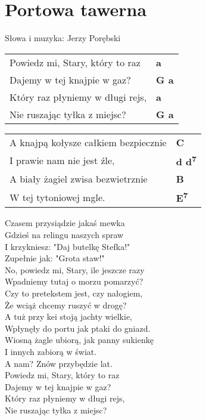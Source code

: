 \section{Portowa tawerna}

Słowa i muzyka: Jerzy Porębski

\vspace{2em}
\begin{tabular}{@{}p{6cm}@{}l@{}}
Powiedz mi, Stary, który to raz & \bfseries a\\
Dajemy w tej knajpie w gaz? & \bfseries G a\\
Który raz płyniemy w długi rejs, & \bfseries a\\
Nie ruszając tyłka z miejsc? & \bfseries G a\\
\end{tabular}

\vspace{1em}
\begin{tabular}{@{}p{6cm}@{}l@{}}
A knajpą kołysze całkiem bezpiecznie & \bfseries C\\
I prawie nam nie jest źle, & \bfseries d d\textsuperscript{7}\\
A biały żagiel zwisa bezwietrznie & \bfseries B\\
W tej tytoniowej mgle. & \bfseries E\textsuperscript{7}\\
\end{tabular}

\vspace{1em}
Czasem przysiądzie jakaś mewka \\
Gdzieś na relingu naszych spraw \\
I krzykniesz: "Daj butelkę Stefka!" \\
Zupełnie jak: "Grota staw!" \\

No, powiedz mi, Stary, ile jeszcze razy \\
Wpadniemy tutaj o morzu pomarzyć? \\
Czy to pretekstem jest, czy nałogiem, \\
Że wciąż chcemy ruszyć w drogę? \\

A tuż przy kei stoją jachty wielkie, \\
Wpłynęły do portu jak ptaki do gniazd. \\
Wiosną żagle ubiorą, jak panny sukienkę \\
I innych zabiorą w świat. \\
A nam? Znów przybędzie lat. \\

Powiedz mi, Stary, który to raz \\
Dajemy w tej knajpie w gaz? \\
Który raz płyniemy w długi rejs, \\
Nie ruszając tyłka z miejsc? \\
